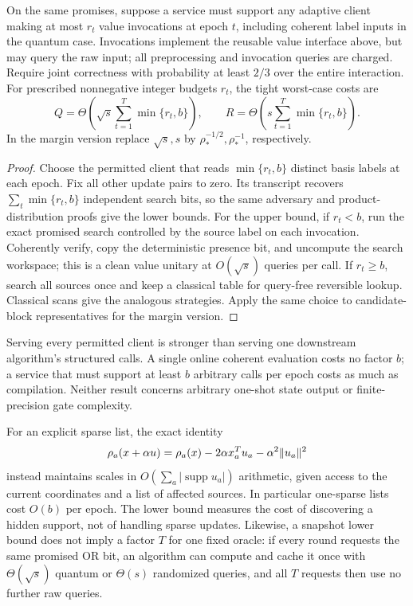 \begin{corollary}
\label{newt:scale-service}
On the same promises, suppose a service must support any adaptive client
making at most $r_t$ value invocations at epoch $t$, including coherent
label inputs in the quantum case.  Invocations implement the reusable
value interface above, but may query the raw input; all preprocessing and
invocation queries are charged.  Require joint correctness with probability
at least $2/3$ over the entire interaction.  For prescribed nonnegative
integer budgets $r_t$, the tight worst-case costs are
\begin{equation}\label{newt:scale-service-cost}
 Q=\Theta\left(\sqrt s\sum_{t=1}^T\min\{r_t,b\}\right),\qquad
 R=\Theta\left(s\sum_{t=1}^T\min\{r_t,b\}\right).
\end{equation}
In the margin version replace $\sqrt s,s$ by
$\rho_*^{-1/2},\rho_*^{-1}$, respectively.
\end{corollary}
\begin{proof}
Choose the permitted client that reads $\min\{r_t,b\}$ distinct basis
labels at each epoch.  Fix all other update pairs to zero.  Its transcript
recovers $\sum_t\min\{r_t,b\}$ independent search bits, so the same
adversary and product-distribution proofs give the lower bounds.
For the upper bound, if $r_t<b$, run the exact promised search controlled
by the source label on each invocation.  Coherently verify, copy the
deterministic presence bit, and uncompute the search workspace; this is a
clean value unitary at $O(\sqrt s)$ queries per call.  If $r_t\geq b$,
search all sources once and keep a classical table for query-free reversible
lookup.  Classical scans give the analogous strategies.  Apply the same
choice to candidate-block representatives for the margin version.
\end{proof}

Serving every permitted client is stronger than serving one downstream
algorithm's structured calls.  A single online coherent evaluation costs
no factor $b$; a service that must support at least $b$ arbitrary calls
per epoch costs as much as compilation.  Neither result concerns arbitrary one-shot state
output or finite-precision gate complexity.

For an explicit sparse list, the exact identity
\begin{equation}\label{newt:scale-update}
 \rho_a(x+\alpha u)=\rho_a(x)-2\alpha x_a^Tu_a
                               -\alpha^2\lVert u_a\rVert^2
\end{equation}
instead maintains scales in $O(\sum_a|\operatorname{supp}u_a|)$
arithmetic, given access to the current coordinates and a list of affected
sources.  In particular one-sparse lists cost $O(b)$ per epoch.
The lower bound measures the cost of discovering a hidden support, not
of handling sparse updates.  Likewise, a snapshot lower bound does not
imply a factor $T$ for one fixed oracle: if every round requests the
same promised OR bit, an algorithm can compute and cache it once with
$\Theta(\sqrt s)$ quantum or $\Theta(s)$ randomized queries, and all $T$
requests then use no further raw queries.

